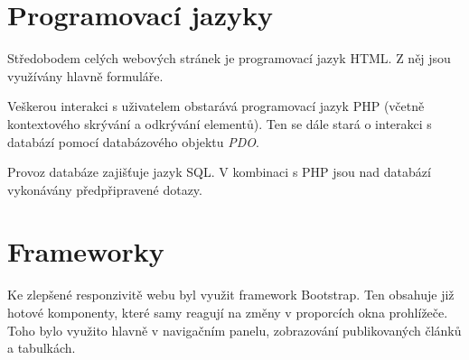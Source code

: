 \section{Programovací jazyky}
Středobodem celých webových stránek je programovací jazyk HTML. Z něj jsou využívány hlavně formuláře.
\par
Veškerou interakci s uživatelem obstarává programovací jazyk PHP (včetně kontextového skrývání a odkrývání elementů). Ten se dále stará o interakci s databází pomocí databázového objektu \emph{PDO}.
\par
Provoz databáze zajišťuje jazyk SQL. V kombinaci s PHP jsou nad databází vykonávány předpřipravené dotazy.

\section{Frameworky}
Ke zlepšené responzivitě webu byl využit framework Bootstrap. Ten obsahuje již hotové komponenty, které samy reagují na změny v proporcích okna prohlížeče. Toho bylo využito hlavně v navigačním panelu, zobrazování publikovaných článků a tabulkách.

